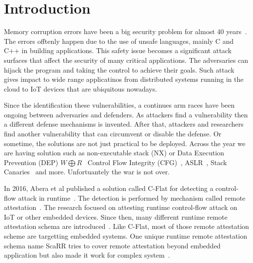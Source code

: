 
\chapter{Introduction} %

\label{Chapter1} %

Memory corruption errors have been a big security problem for almost 40
years~\cite{szekeresSoKEternalWar2013,vanderveenMemoryErrorsPresent2012}. The
errors offtenly happen due to the use of unsafe languages, mainly C and C++ in
building applications. This safety issue becomes a significant attack surfaces
that affect the security of many critical applications. The adversaries can
hijack the program and taking the control to achieve their goals. Such attack
gives impact to wide range applicatinos from distributed systems running in the
cloud to IoT devices that are ubiquitous nowadays.

Since the identification these vulnerabilities, a continues arm races have been
ongoing between adversaries and defenders. As attackers find a vulnerability
then a different defense mechanisms is invented. After that, attackers and
researchers find another vulnerability that can circumvent or disable the
defense. Or sometime, the solutions are not just practical to be deployed.
Across the year we are having solution such as non-executable stack (NX) or Data
Execution Prevention (DEP)  \( W \bigoplus R
\)~\cite{vanderveenMemoryErrorsPresent2012} Control Flow Integrity
(CFG)~\cite{abadiControlFlowIntegrityPrinciples2005},
ASLR~\cite{kilAddressSpaceLayout2006}, Stack
Canaries~\cite{baratlooTransparentRunTimeDefense2000} and more. Unfortuantely
the war is not over.

In 2016, Abera et al published a solution called C-Flat for detecting a
control-flow attack in runtime~\cite{aberaCFLATControlFlowAttestation2016}. The
detection is performed by mechanism called remote
attestation~\cite{haldarSemanticRemoteAttestationA2004}. The research focused on
attesting runtime control-flow attack on IoT or other embedded devices. Since
then, many different runtime remote attestation schema are
introduced~\cite{dessoukyLOFATLowOverheadControl2017,
zeitouniATRIUMRuntimeAttestation2017, kohnhauserSCAPIScalableAttestation2017,
dessoukyLiteHAXLightweightHardwareassisted2018, aberaDIATDataIntegrity2019,
koutroumpouchosSecureEdgeComputing2019, sunOATAttestingOperation2020}. Like
C-Flat, most of those remote attestation scheme are targetting embedded systems.
One unique runtime remote attestation schema name ScaRR tries to cover remote
attestation beyond embedded application but also made it work for complex
system~\cite{toffaliniScaRRScalableRuntime2019}. 

